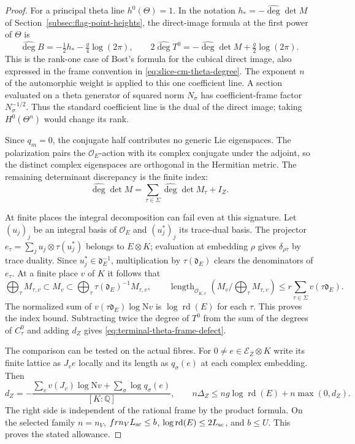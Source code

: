 \begin{proof}
For a principal theta line \(h^0(\Theta)=1\). In the notation \(h_*=-\widehat{\deg}\det M\) of Section~\ref{subsec:flag-point-heights}, the direct-image formula at the first power of \(\Theta\) is
\[
 \widehat{\deg} B=-\tfrac12 h_*-\tfrac g4\log(2\pi),\qquad
 2\widehat{\deg} T^0=-\widehat{\deg}\det M+\tfrac g2\log(2\pi).
\]
This is the rank-one case of Bost's formula for the cubical direct image, also expressed in the frame convention in \eqref{eq:slice-cm-theta-degree}. \cite[Gaudron, 2019, \S2.3.2]{bost-mb-flag}
The exponent \(n\) of the automorphic weight is applied to this one coefficient line. A section evaluated on a theta generator of squared norm \(N_\sigma\) has coefficient-frame factor \(N_\sigma^{-1/2}\). Thus the standard coefficient line is the dual of the direct image; taking \(H^0(\Theta^n)\) would change its rank.

Since \(q_m=0\), the conjugate half contributes no generic Lie eigenspaces. The polarization pairs the \(\mathcal O_E\)-action with its complex conjugate under the adjoint, so the distinct complex eigenspaces are orthogonal in the Hermitian metric. The remaining determinant discrepancy is the finite index:
\[
 \widehat{\deg}\det M=\sum_{\tau\in\Sigma}\widehat{\deg}\det M_\tau+I_Z .
\]

At finite places the integral decomposition can fail even at this signature. Let \((u_j)_j\) be an integral basis of \(\mathcal O_E\) and \((u_j^*)_j\) its trace-dual basis. The projector \(e_\tau=\sum_j u_j\otimes\tau(u_j^*)\) belongs to \(E\otimes K\); evaluation at embedding \(\rho\) gives \(\delta_{\rho\tau}\) by trace duality. Since \(u_j^*\in\mathfrak d_E^{-1}\), multiplication by \(\tau(\mathfrak d_E)\) clears the denominators of \(e_\tau\). At a finite place \(v\) of \(K\) it follows that
\[
 \bigoplus_\tau M_{\tau,v}\subset M_v
      \subset\bigoplus_\tau \tau(\mathfrak d_E)^{-1}M_{\tau,v},\qquad
 \operatorname{length}_{\mathcal O_{K,v}}(M_v/\textstyle\bigoplus_\tau M_{\tau,v})
     \le r\sum_{\tau\in\Sigma}v(\tau\mathfrak d_E).
\]
The normalized sum of \(v(\tau\mathfrak d_E)\log\mathrm Nv\) is \(\log\operatorname{rd}(E)\) for each \(\tau\). This proves the index bound. Subtracting twice the degree of \(T^0\) from the sum of the degrees of \(C_\tau^0\) and adding \(d_Z\) gives \eqref{eq:terminal-theta-frame-defect}.

The comparison can be tested on the actual fibres. For \(0\ne e\in\mathcal E_Z\otimes K\) write its finite lattice as \(J_v e\) locally and its length as \(q_\sigma(e)\) at each complex embedding. Then
\[
 d_Z=-\frac{\sum_v v(J_v)\log\mathrm Nv+\sum_\sigma\log q_\sigma(e)}
                    {[K:\mathbb Q]},\qquad
 n\Delta_Z\le n g\log\operatorname{rd}(E)+n\max(0,d_Z).
\]
The right side is independent of the rational frame by the product formula. On the selected family \(n=n_V\), \(frn_V L_{\rm sc}\le b\), \(\log\operatorname{rd}(E)\le2L_{\rm sc}\), and \(b\le U\). This proves the stated allowance.
\end{proof}

